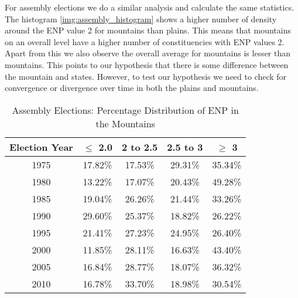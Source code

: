 For assembly elections we do a similar analysis and calculate the same statistics. The histogram \ref{img:assembly_histogram} shows a higher number of density around the ENP value 2 for mountains than plains. This means that mountains on an overall level have a higher number of constituencies with ENP values 2. Apart from this we also observe the overall average for mountains is lesser than mountains. This points to our hypothesis that there is some difference between the mountain and states. However, to test our hypothesis we need to check for convergence or divergence over time in both the plains and mountains. 

\begin{table}[h]
    \centering
    \begin{tabular}{|c|c|c|c|c|}
    \hline
    Election Year & $\leq$ 2.0 & 2 to 2.5 & 2.5 to 3 & $\geq$ 3 \\ \hline
    1975 & 17.82\% & 17.53\% & 29.31\% & 35.34\% \\ \hline
    1980 & 13.22\% & 17.07\% & 20.43\% & 49.28\% \\ \hline
    1985 & 19.04\% & 26.26\% & 21.44\% & 33.26\% \\ \hline
    1990 & 29.60\% & 25.37\% & 18.82\% & 26.22\% \\ \hline
    1995 & 21.41\% & 27.23\% & 24.95\% & 26.40\% \\ \hline
    2000 & 11.85\% & 28.11\% & 16.63\% & 43.40\% \\ \hline
    2005 & 16.84\% & 28.77\% & 18.07\% & 36.32\% \\ \hline
    2010 & 16.78\% & 33.70\% & 18.98\% & 30.54\% \\ \hline
    \end{tabular}
    \caption{Assembly Elections: Percentage Distribution of ENP in the Mountains}
    \label{tab:assembly_mountain_percentage_district}
    \end{table}

